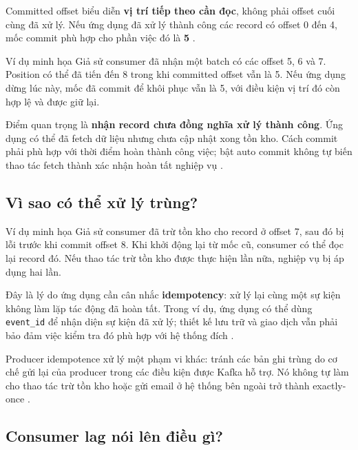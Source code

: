 Committed offset biểu diễn \textbf{vị trí tiếp theo cần đọc}, không phải offset cuối cùng đã xử lý. Nếu ứng dụng đã xử lý thành công các record có offset 0 đến 4, mốc commit phù hợp cho phần việc đó là \textbf{5} \cite{kafka-consumer-api}.


\begin{examplebox}{Ví dụ minh họa}
Giả sử consumer đã nhận một batch có các offset 5, 6 và 7. Position có thể đã tiến đến 8 trong khi committed offset vẫn là 5. Nếu ứng dụng dừng lúc này, mốc đã commit để khôi phục vẫn là 5, với điều kiện vị trí đó còn hợp lệ và được giữ lại.
\end{examplebox}


Điểm quan trọng là \textbf{nhận record chưa đồng nghĩa xử lý thành công}. Ứng dụng có thể đã fetch dữ liệu nhưng chưa cập nhật xong tồn kho. Cách commit phải phù hợp với thời điểm hoàn thành công việc; bật auto commit không tự biến thao tác fetch thành xác nhận hoàn tất nghiệp vụ \cite{kafka-consumer-configs}.


\FloatBarrier
{}
\subsection{Vì sao có thể xử lý trùng?}

\begin{examplebox}{Ví dụ minh họa}
Giả sử consumer đã trừ tồn kho cho record ở offset 7, sau đó bị lỗi trước khi commit offset 8. Khi khởi động lại từ mốc cũ, consumer có thể đọc lại record đó. Nếu thao tác trừ tồn kho được thực hiện lần nữa, nghiệp vụ bị áp dụng hai lần.
\end{examplebox}


Đây là lý do ứng dụng cần cân nhắc \textbf{idempotency}: xử lý lại cùng một sự kiện không làm lặp tác động đã hoàn tất. Trong ví dụ, ứng dụng có thể dùng \texttt{event\_\allowbreak{}id} để nhận diện sự kiện đã xử lý; thiết kế lưu trữ và giao dịch vẫn phải bảo đảm việc kiểm tra đó phù hợp với hệ thống đích \cite{kafka-design}.


Producer idempotence xử lý một phạm vi khác: tránh các bản ghi trùng do cơ chế gửi lại của producer trong các điều kiện được Kafka hỗ trợ. Nó không tự làm cho thao tác trừ tồn kho hoặc gửi email ở hệ thống bên ngoài trở thành exactly-once \cite{kafka-producer-api}.


\FloatBarrier
{}
\subsection{Consumer lag nói lên điều gì?}

